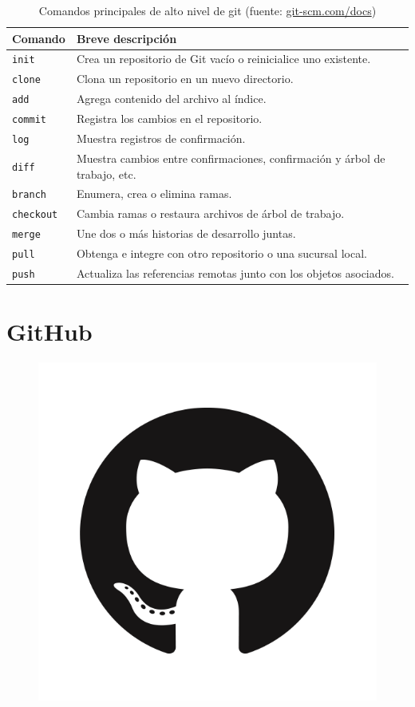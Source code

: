 \begin{table}[ht!]
	\caption{Comandos principales de alto nivel de git (fuente: \url{git-scm.com/docs})}
	\centering
	\begin{tabular}{@{} ll @{}}
	\toprule
	Comando & Breve descripción
	\tabularnewline
	\midrule
	\lstinline|init| & Crea un repositorio de Git vacío o reinicialice uno existente.
	\tabularnewline
	\lstinline|clone| & Clona un repositorio en un nuevo directorio.
	\tabularnewline
	\lstinline|add| & Agrega contenido del archivo al índice.
	\tabularnewline
	\lstinline|commit| & Registra los cambios en el repositorio.
	\tabularnewline
	\lstinline|log| & Muestra registros de confirmación.
	\tabularnewline
	\lstinline|diff| & Muestra cambios entre confirmaciones, confirmación y árbol de trabajo, etc.
	\tabularnewline
	\lstinline|branch| & Enumera, crea o elimina ramas.
	\tabularnewline
	\lstinline|checkout| & Cambia ramas o restaura archivos de árbol de trabajo.
	\tabularnewline
	\lstinline|merge|& Une dos o más historias de desarrollo juntas.
	\tabularnewline
	\lstinline|pull| & Obtenga e integre con otro repositorio o una sucursal local.
	\tabularnewline
	\lstinline|push| & Actualiza las referencias remotas junto con los objetos asociados.
	\tabularnewline
	\bottomrule
	\end{tabular}
\end{table}

\section{GitHub}
\lipsum[1]
\begin{figure}
	\includegraphics[width=0.14\paperwidth]{./img/github}
\end{figure}
\lipsum[1]


